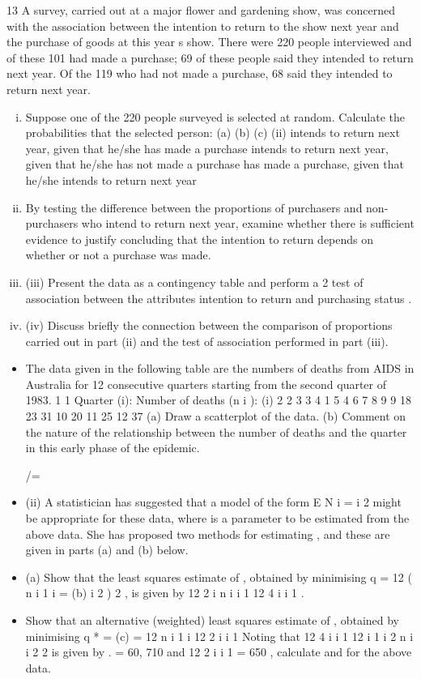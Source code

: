 \documentclass[a4paper,12pt]{article}
\begin{document}
13
A survey, carried out at a major flower and gardening show, was concerned with the association between the intention to return to the show next year and the purchase of goods at this year s show. There were 220 people interviewed and of these 101 had
made a purchase; 69 of these people said they intended to return next year. Of the 119 who had not made a purchase, 68 said they intended to return next year.

\begin{enumerate}[(i)]
\item Suppose one of the 220 people surveyed is selected at random.
Calculate the probabilities that the selected person:
(a)
(b)
(c)
(ii)
intends to return next year, given that he/she has made a purchase
intends to return next year, given that he/she has not made a purchase
has made a purchase, given that he/she intends to return next year

\item By testing the difference between the proportions of purchasers and non-purchasers who intend to return next year, examine whether there is sufficient evidence to justify concluding that the intention to return depends on whether
or not a purchase was made.

\item (iii) Present the data as a contingency table and perform a 2 test of association between the attributes intention to return and purchasing status .
\item
(iv) Discuss briefly the connection between the comparison of proportions carried out in part (ii) and the test of association performed in part (iii).
\end{enumerate}

\newpage
\begin{itemize}
\item The data given in the following table are the numbers of deaths from AIDS in Australia for 12 consecutive quarters starting from the second quarter of 1983.
1
1
Quarter (i):
Number of deaths (n i ):
(i)
2
2
3
3
4
1
5
4
6 7 8 9
9 18 23 31
10
20
11
25
12
37
(a) Draw a scatterplot of the data.
(b) Comment on the nature of the relationship between the number of
deaths and the quarter in this early phase of the epidemic.

/=\item (ii)
A statistician has suggested that a model of the form
E N i = i 2
might be appropriate for these data, where is a parameter to be estimated from the above data. She has proposed two methods for estimating , and these are given in parts (a) and (b) below.
\item (a)
Show that the least squares estimate of , obtained by minimising
q =
12
( n
i 1 i
=
(b)
i 2 ) 2 , is given by
12 2
i n i
i 1
12 4
i
i 1
.
\item Show that an alternative (weighted) least squares estimate of ,
obtained by minimising q * =
(c)
= 12
n
i 1 i
12 2
i
i 1
Noting that 12 4
i
i 1
12
i 1
i 2
n i
i 2
2
is given by
.
= 60, 710 and
12 2
i
i 1
= 650 , calculate
and
for the above data.
\end{itemize}
\newpage
\end{document}
